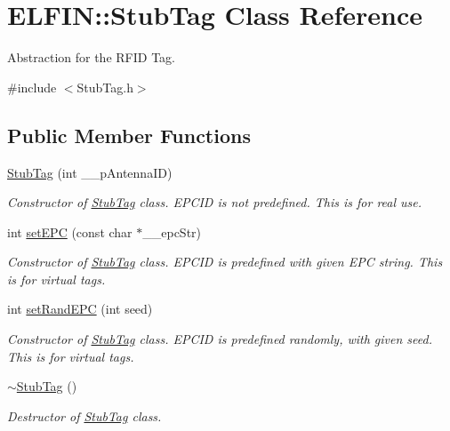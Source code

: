 \hypertarget{class_e_l_f_i_n_1_1_stub_tag}{\section{E\-L\-F\-I\-N\-:\-:Stub\-Tag Class Reference}
\label{class_e_l_f_i_n_1_1_stub_tag}
}


Abstraction for the R\-F\-I\-D Tag.  




{\ttfamily \#include $<$Stub\-Tag.\-h$>$}

\subsection*{Public Member Functions}
\begin{DoxyCompactItemize}
\item 
\hyperlink{class_e_l_f_i_n_1_1_stub_tag_a47f910ccf2c5208da7135c09c4fe381e}{Stub\-Tag} (int \-\_\-\-\_\-p\-Antenna\-I\-D)
\begin{DoxyCompactList}\small\item\em Constructor of \hyperlink{class_e_l_f_i_n_1_1_stub_tag}{Stub\-Tag} class. E\-P\-C\-I\-D is not predefined. This is for real use. \end{DoxyCompactList}\item 
int \hyperlink{class_e_l_f_i_n_1_1_stub_tag_aa7e25641d599c95809dc6d937e04b6a7}{set\-E\-P\-C} (const char $\ast$\-\_\-\-\_\-epc\-Str)
\begin{DoxyCompactList}\small\item\em Constructor of \hyperlink{class_e_l_f_i_n_1_1_stub_tag}{Stub\-Tag} class. E\-P\-C\-I\-D is predefined with given E\-P\-C string. This is for virtual tags. \end{DoxyCompactList}\item 
int \hyperlink{class_e_l_f_i_n_1_1_stub_tag_a20942c3a84f3628030c5e4f118002a3a}{set\-Rand\-E\-P\-C} (int seed)
\begin{DoxyCompactList}\small\item\em Constructor of \hyperlink{class_e_l_f_i_n_1_1_stub_tag}{Stub\-Tag} class. E\-P\-C\-I\-D is predefined randomly, with given seed. This is for virtual tags. \end{DoxyCompactList}\item 
\hyperlink{class_e_l_f_i_n_1_1_stub_tag_a0ab3bd8f809c41265ca6c53046b3879c}{$\sim$\-Stub\-Tag} ()
\begin{DoxyCompactList}\small\item\em Destructor of \hyperlink{class_e_l_f_i_n_1_1_stub_tag}{Stub\-Tag} class. \end{DoxyCompactList}\item 

\end{DoxyCompactItemize}
